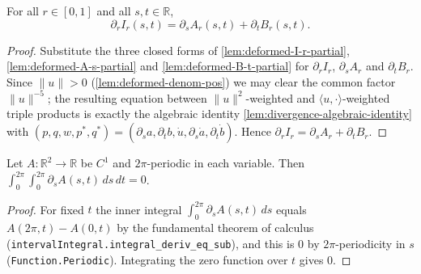 \begin{lemma}
    \label{lem:integrand-r-divergence}
    For all $r\in[0,1]$ and all $s,t\in\mathbb{R}$,
    \[
        \partial_r I_r(s,t) = \partial_s A_r(s,t) + \partial_t B_r(s,t) .
    \]
\end{lemma}
\begin{proof}
    Substitute the three closed forms of \cref{lem:deformed-I-r-partial},
    \cref{lem:deformed-A-s-partial} and \cref{lem:deformed-B-t-partial} for
    $\partial_r I_r$, $\partial_s A_r$ and $\partial_t B_r$. Since
    $\lVert u\rVert>0$ (\cref{lem:deformed-denom-pos}) we may clear the common factor
    $\lVert u\rVert^{-5}$; the resulting equation between $\lVert u\rVert^{2}$-weighted
    and $\langle u,\cdot\rangle$-weighted triple products is exactly the algebraic
    identity \cref{lem:divergence-algebraic-identity} with
    $(p,q,w,p^\ast,q^\ast)=(\partial_s a,\partial_t b,\dot u,\partial_s\dot a,
    \partial_t\dot b)$. Hence $\partial_r I_r=\partial_s A_r+\partial_t B_r$.
\end{proof}

\begin{lemma}
    \label{lem:periodic-partial-s-integral-zero}
    Let $A : \mathbb{R}^2\to\mathbb{R}$ be $C^1$ and $2\pi$-periodic in each
    variable. Then $\int_0^{2\pi}\!\int_0^{2\pi}\partial_s A(s,t)\,ds\,dt = 0$.
\end{lemma}
\begin{proof}
    For fixed $t$ the inner integral $\int_0^{2\pi}\partial_s A(s,t)\,ds$ equals
    $A(2\pi,t) - A(0,t)$ by the fundamental theorem of calculus
    (\texttt{intervalIntegral.integral\_deriv\_eq\_sub}), and this is $0$ by
    $2\pi$-periodicity in $s$ (\texttt{Function.Periodic}). Integrating the zero
    function over $t$ gives $0$.
\end{proof}

